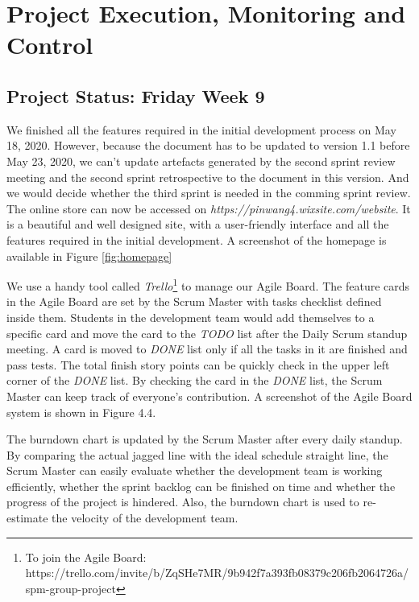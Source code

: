 \documentclass{report}
\begin{document}
\chapter{Project Execution, Monitoring and Control}
\label{chap:pe}
\section{Project Status: Friday Week 9}
\label{sec:ps1}
We finished all the features required in the initial development process on May 18, 2020. However, because the document has to be updated to version 1.1 before May 23, 2020, we can’t update artefacts generated by the second sprint review meeting and the second sprint retrospective to the document in this version. And we would decide whether the third sprint is needed in the comming sprint review. The online store can now be accessed on \textit{https://pinwang4.wixsite.com/website}. It is a beautiful and well designed site, with a user-friendly interface and all the features required in the initial development. A screenshot of the homepage is available in Figure \ref{fig:homepage}

We use a handy tool called \textit{Trello}\footnote{To join the Agile Board: https://trello.com/invite/b/ZqSHe7MR/9b942f7a393fb08379c206fb2064726a/spm-group-project} to manage our Agile Board. The feature cards in the Agile Board are set by the Scrum Master with tasks checklist defined inside them. Students in the development team would add themselves to a specific card and move the card to the \textit{TODO} list after the Daily Scrum standup meeting. A card is moved to \textit{DONE} list only if all the tasks in it are finished and pass tests. The total finish story points can be quickly check in the upper left corner of the \textit{DONE} list. By checking the card in the \textit{DONE} list, the Scrum Master can keep track of everyone’s contribution. A screenshot of the Agile Board system is shown in Figure 4.4.

The burndown chart is updated by the Scrum Master after every daily standup. By comparing the actual jagged line with the ideal schedule straight line, the Scrum Master can easily evaluate whether the development team is working efficiently, whether the sprint backlog can be finished on time and whether the progress of the project is hindered. Also, the burndown chart is used to re-estimate the velocity of the development team. 
\end{document}
